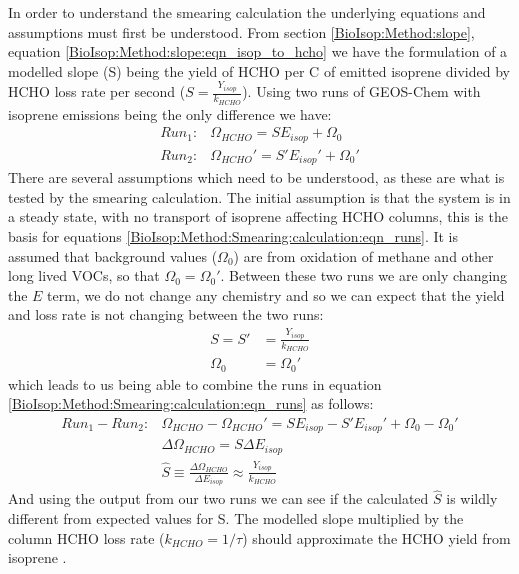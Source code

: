     In order to understand the smearing calculation the underlying equations and assumptions must first be understood.
    From section \ref{BioIsop:Method:slope}, equation \ref{BioIsop:Method:slope:eqn_isop_to_hcho} we have the formulation of a modelled slope (S) being the yield of HCHO per C of emitted isoprene divided by HCHO loss rate per second ($S = \frac{Y_{isop}}{k_{HCHO}}$).
    Using two runs of GEOS-Chem with isoprene emissions being the only difference we have:
    \begin{eqnarray}
      \label{BioIsop:Method:Smearing:calculation:eqn_runs}
      Run_1 :&  \Omega_{HCHO} = S E_{isop} + \Omega_0 \\
      Run_2 :&  \Omega_{HCHO}' = S' E_{isop}' + \Omega_0' 
    \end{eqnarray}
    There are several assumptions which need to be understood, as these are what is tested by the smearing calculation.
    The initial assumption is that the system is in a steady state, with no transport of isoprene affecting HCHO columns, this is the basis for equations \ref{BioIsop:Method:Smearing:calculation:eqn_runs}.
    It is assumed that background values ($\Omega_0$) are from oxidation of methane and other long lived VOCs, so that $\Omega_0 = \Omega_0'$.
    Between these two runs we are only changing the $E$ term, we do not change any chemistry and so we can expect that the yield and loss rate is not changing between the two runs:
    \begin{eqnarray*}
      S = S' & = \frac{Y_{isop}}{k_{HCHO}} \\
      \Omega_0 & = \Omega_0'
    \end{eqnarray*}
    which leads to us being able to combine the runs in equation \ref{BioIsop:Method:Smearing:calculation:eqn_runs} as follows:
    \begin{eqnarray}
      \label{BioIsop:Method:Smearing:calculation:eqn_hats}
      Run_1-Run_2 :& \Omega_{HCHO} - \Omega_{HCHO}' = S E_{isop} - S' E_{isop}' +\Omega_0 - \Omega_0' \\
      & \Delta \Omega_{HCHO} = S \Delta E_{isop} \\
      & \hat{S} \equiv \frac{\Delta{\Omega_{HCHO}}}{\Delta E_{isop}} \approx \frac{Y_{isop}}{k_{HCHO}}
    \end{eqnarray}
    And using the output from our two runs we can see if the calculated $\hat{S}$ is wildly different from expected values for S.
    The modelled slope multiplied by the column HCHO loss rate ($k_{HCHO} = 1/\tau$) should approximate the HCHO yield from isoprene \parencite{Palmer2003, Barkley2013}.
    
